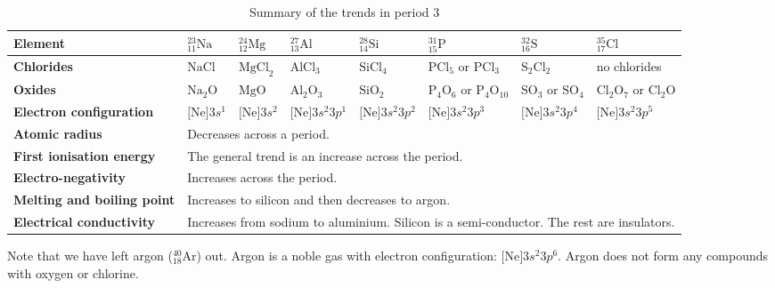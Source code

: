 \begin{table}[H]
 \begin{center}
  \begin{tabular}{|p{2cm}|p{1cm}|p{1cm}|p{1.4cm}|p{1.4cm}|p{1.4cm}|p{1.4cm}|p{1.4cm}|} \hline
\textbf{Element} & $^{23}_{11}\text{Na}$ & $^{24}_{12}\text{Mg}$ &  $^{27}_{13}\text{Al}$ & $^{28}_{14}\text{Si}$ &  $^{31}_{15}\text{P}$ & $^{32}_{16}\text{S}$ & $^{35}_{17}\text{Cl}$ \\ \hline
   \textbf{Chlorides} & $\text{NaCl}$ & $\text{MgCl}_2$ & $\text{AlCl}_{3}$ & $\text{SiCl}_{4}$ & $\text{PCl}_{5}$ or $\text{PCl}_{3}$ & $\text{S}_{2}\text{Cl}_{2}$ & no chlorides  \\ \hline
\textbf{Oxides} & $\text{Na}_{2}\text{O}$ & $\text{MgO}$ & $\text{Al}_{2}\text{O}_{3}$ & $\text{SiO}_{2}$ & $\text{P}_{4}\text{O}_{6}$ or $\text{P}_{4}\text{O}_{10}$ & $\text{SO}_{3}$ or $\text{SO}_{4}$ & $\text{Cl}_{2}\text{O}_{7}$ or $\text{Cl}_{2}\text{O}$ \\ \hline
\textbf{Electron configuration} & $\text{[Ne]}3s^{1}$ & $\text{[Ne]}3s^{2}$ & $\text{[Ne]}3s^{2}3p^{1}$ & $\text{[Ne]}3s^{2}3p^{2}$ & $\text{[Ne]}3s^{2}3p^{3}$ & $\text{[Ne]}3s^{2}3p^{4}$ & $\text{[Ne]}3s^{2}3p^{5}$  \\ \hline
\textbf{Atomic radius} & \multicolumn{7}{p{8cm}|}{Decreases across a period.} \\ \hline
\textbf{First ionisation energy} & \multicolumn{7}{p{8cm}|}{The general trend is an increase across the period.} \\ \hline
\textbf{Electro-negativity} & \multicolumn{7}{p{8cm}|}{Increases across the period.} \\ \hline
\textbf{Melting and boiling point} & \multicolumn{7}{p{8cm}|}{Increases to silicon and then decreases to argon.} \\ \hline
\textbf{Electrical conductivity} & \multicolumn{7}{p{10cm}|}{Increases from sodium to aluminium. Silicon is a semi-conductor. The rest are insulators.} \\ \hline
  \end{tabular}
\caption{Summary of the trends in period 3}
\label{tab:period3trends}
 \end{center}

\end{table}
Note that we have left argon ($^{40}_{18}\text{Ar}$) out. Argon is a noble gas with electron configuration: $\text{[Ne]}3s^{2}3p^{6}$. Argon does not form any compounds with oxygen or chlorine. 
